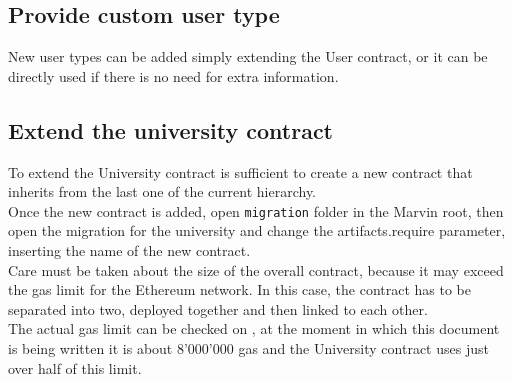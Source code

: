 \documentclass[ManualeSviluppatore]{subfiles}
\begin{document}
\subsection{Provide custom user type}
New user types can be added simply extending the User contract, or it can be directly used if there is no need for extra information. \\

\subsection{Extend the university contract}
To extend the University contract is sufficient to create a new contract that inherits from the last one of the current hierarchy. \\
Once the new contract is added, open \texttt{migration} folder in the Marvin root, then open the migration for the university and change the artifacts.require parameter, inserting the name of the new contract. \\
Care must be taken about the size of the overall contract, because it may exceed the gas limit for the Ethereum network. In this case, the contract has to be separated into two, deployed together and then linked to each other. \\
The actual gas limit can be checked on , at the moment in which this document is being written it is about 8'000'000 gas and the University contract uses just over half of this limit. \\
\end{document}
